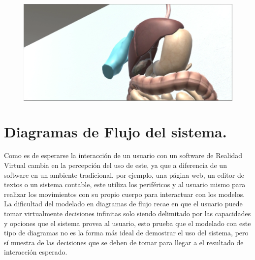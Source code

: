 \begin{figure}[H]
	\begin{center}
 		\includegraphics[width = .5\textwidth]{source/images/image67.png}
	\end{center} 
\end{figure}

\section{Diagramas de Flujo del sistema.}
Como es de esperarse la interacción de un usuario con un software de Realidad Virtual cambia en la percepción del uso de este, ya que a diferencia de un software en un ambiente tradicional, por ejemplo, una página web, un editor de textos o un sistema contable, este utiliza los periféricos y al usuario mismo para realizar los movimientos con su propio cuerpo para interactuar con los modelos.\\

La dificultad del modelado en diagramas de flujo recae en que el usuario puede tomar virtualmente decisiones infinitas solo siendo delimitado por las capacidades y opciones que el sistema provea al usuario, esto prueba que el modelado con este tipo de diagramas no es la forma más ideal de demostrar el uso del sistema, pero sí muestra de las decisiones que se deben de tomar para llegar a el resultado de interacción esperado.\\

